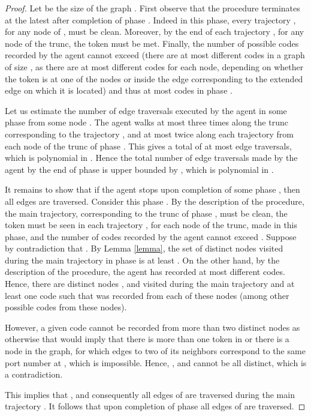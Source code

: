 \documentclass [11pt] {article}
\begin{document}
\begin{proof}
{Let  be the size of the graph .
First observe that the procedure terminates at the latest after completion of phase {}. Indeed in this phase, every trajectory , for any node  of , must be clean.
{Moreover, by the end of each trajectory , for any node  of the trunc, the token must be met. Finally,} the number of possible codes recorded by the agent cannot exceed { (there are at most  different codes in a graph of size , as there are at most  different codes for each node, {depending on whether the token is at one of the nodes or inside the edge corresponding to the extended edge on which it is located)} and thus at most  codes in phase .}}

{Let us estimate the number of edge traversals executed by the agent in some phase  from some node . The agent walks at most three times along the trunc corresponding to the trajectory , and at most twice along each trajectory  from each node  of the trunc of phase . This gives a total of at most  edge traversals, which is polynomial in .}
{Hence the total number of edge traversals made by the agent by the end of phase  is upper bounded by {, which is polynomial in .}}

{It remains to show that if the agent stops upon completion of some phase , then all {edges are traversed}. Consider this phase .  By the description of the procedure, the main trajectory, corresponding to the trunc of phase , must be clean, the token must be seen
in each trajectory , for each node  of the trunc, made in this phase, and the number of codes recorded by the agent cannot exceed {}.
Suppose by contradiction that .
By Lemma \ref{lemma}, the set of distinct nodes visited during the main trajectory  in phase  is at least .
On the other hand, by the description of the procedure, the agent has recorded at most {} different codes.}
{Hence, there are  distinct nodes ,  and  visited during the main trajectory  and at least one code  such that  was recorded from each of these nodes (among  other possible codes from these nodes).}

{However, a given code cannot be recorded from more than two distinct nodes as otherwise that would imply that there is more than one token in  or there is a node  in the graph, for which edges to two of its neighbors correspond to the same port number at , which is impossible. Hence, ,  and  cannot be all distinct, which is a contradiction.}

{This implies that , and consequently all {edges of  are traversed} during the main trajectory . It follows that upon completion of phase  all {edges of  are traversed}.}
\end{proof}
\end{document}
